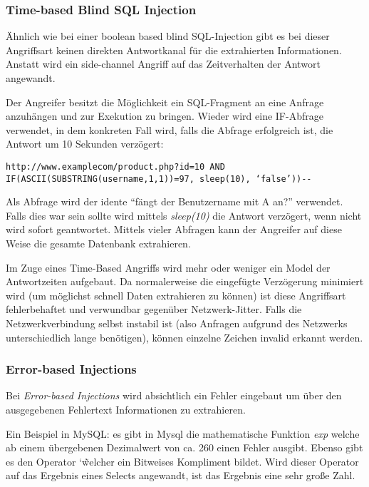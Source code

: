 \subsubsection{Time-based Blind SQL Injection}

Ähnlich wie bei einer boolean based blind SQL-Injection gibt es bei dieser Angriffsart keinen direkten Antwortkanal für die extrahierten Informationen. Anstatt wird ein side-channel Angriff auf das Zeitverhalten der Antwort angewandt.

Der Angreifer besitzt die Möglichkeit ein SQL-Fragment an eine Anfrage anzuhängen und zur Exekution zu bringen. Wieder wird eine IF-Abfrage verwendet, in dem konkreten Fall wird, falls die Abfrage erfolgreich ist, die Antwort um 10 Sekunden verzögert:

\begin{verbatim}
http://www.examplecom/product.php?id=10 AND IF(ASCII(SUBSTRING(username,1,1))=97, sleep(10), ‘false’))--
\end{verbatim}

Als Abfrage wird der idente ``fängt der Benutzername mit A an?'' verwendet. Falls dies war sein sollte wird mittels \textit{sleep(10)} die Antwort verzögert, wenn nicht wird sofort geantwortet. Mittels vieler Abfragen kann der Angreifer auf diese Weise die gesamte Datenbank extrahieren.

Im Zuge eines Time-Based Angriffs wird mehr oder weniger ein Model der Antwortzeiten aufgebaut. Da normalerweise die eingefügte Verzögerung minimiert wird (um möglichst schnell Daten extrahieren zu können) ist diese Angriffsart fehlerbehaftet und verwundbar gegenüber Netzwerk-Jitter. Falls die Netzwerkverbindung selbst instabil ist (also Anfragen aufgrund des Netzwerks unterschiedlich lange benötigen), können einzelne Zeichen invalid erkannt werden.

\subsubsection{Error-based Injections}

Bei \textit{Error-based Injections} wird absichtlich ein Fehler eingebaut um über den ausgegebenen Fehlertext Informationen zu extrahieren.

Ein Beispiel in MySQL: es gibt in Mysql die mathematische Funktion \textit{exp} welche ab einem übergebenen Dezimalwert von ca. 260 einen Fehler ausgibt. Ebenso gibt es den Operator \char`\~ welcher ein Bitweises Kompliment bildet. Wird dieser Operator auf das Ergebnis eines Selects angewandt, ist das Ergebnis eine sehr große Zahl.

